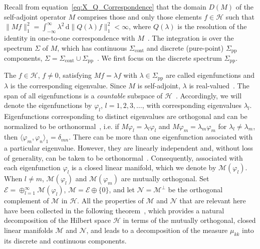 \documentclass[leqno,onefignum,onetabnum]{siamltex1213}
\renewcommand{\d}{\mathrm{d}}
\newcommand{\Sigc}{\Sigma_{\text{cont}}}
\newcommand{\Sigp}{\Sigma_{\text{pp}}}
\newcommand{\Ec}{\mathcal{E}}
\newcommand{\Mc}{\mathcal{M}}
\newcommand{\Nc}{\mathcal{N}}
\newcommand{\Hs}{\mathscr{H}}
\newcommand\bnabla{\mbox{\boldmath${\nabla}$}}
\providecommand\bcdot{\boldsymbol{\cdot}}
\begin{document}
Recall from equation~\eqref{eq:X_Q_Correspondence} that the domain
$D(M)$ of the self-adjoint operator $M$ comprises those and only those
elements $f\in\Hs$ such that $\|Mf\|_1^2=\int_{-\infty}^\infty\lambda^2\,\d\|Q(\lambda)f\|_1^2<\infty$,
where $Q(\lambda)$ is the resolution of the identity in one-to-one
correspondence with $M$~\cite{Stone:64}. The integration is over the
spectrum $\Sigma$ of $M$, which has continuous $\Sigc$ and discrete
(pure-point) $\Sigp$ components,
$\Sigma=\Sigc\cup\Sigp$~\cite{Reed-1980,Stone:64}. We first focus on
the discrete spectrum $\Sigp$.



 The $f\in\Hs$, $f\neq0$, satisfying $Mf=\lambda
f$ with $\lambda\in\Sigp$ are called eigenfunctions and $\lambda$ is the
corresponding eigenvalue. Since $M$ is self-adjoint, $\lambda$ is
real-valued~\cite{Stone:64}. The
span of all eigenfunctions is a \emph{countable} subspace of
$\Hs$~\cite{Stone:64}. Accordingly, we will denote the
eigenfunctions by $\varphi_l$, $l=1,2,3,\ldots$, with corresponding eigenvalues
$\lambda_l$. Eigenfunctions corresponding to distinct eigenvalues
are orthogonal and can be normalized to be
orthonormal~\cite{Stone:64}, i.e. if $M\varphi_l=\lambda_l\varphi_l$ and $M\varphi_m=\lambda_m\varphi_m$
for $\lambda_l\neq\lambda_m$, then $\langle\varphi_m,\varphi_n\rangle_1=\delta_{mn}$.
There can be more than one eigenfunction associated with a particular
eigenvalue. However, they are linearly independent
and, without loss of generality, can be taken to be
orthonormal~\cite{Stone:64}. Consequently, associated with each
eigenfunction $\varphi_l$ is a closed linear manifold, which we denote by
$\Mc(\varphi_l)$. When $l\neq m$, $\Mc(\varphi_l)$ and $\Mc(\varphi_m)$ are mutually 
orthogonal. Set $\Ec=\oplus_{l=1}^\infty\Mc(\varphi_l)$, $\Mc=\Ec\oplus\{0\}$, and let
$\Nc=\Mc^\perp$ be the orthogonal complement of $\Mc$ in $\Hs$. All the
properties of $\Mc$ and $\Nc$ that are relevant here have been
collected in the following theorem~\cite{Stone:64}, which provides a
natural decomposition of the Hilbert space $\Hs$ in terms of the
mutually orthogonal, closed linear manifolds $\Mc$ and $\Nc$, and
leads to a decomposition of the measure $\mu_{kk}$ into its discrete and
continuous components. 
%
\end{document}
